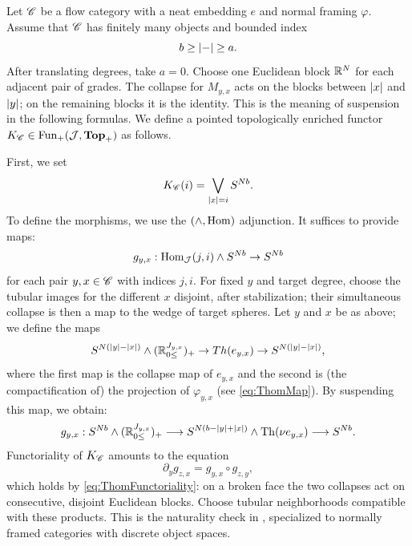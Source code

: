 \begin{constr}\label{con:topChOfCat}
    Let $\mathscr{C}$ be a flow category with a neat embedding $e$ and normal framing $\varphi$.
    Assume that $\mathscr{C}$ has finitely many objects and bounded index
\begin{equation*}
    b \geq \left\lvert-\right\rvert \geq a.
\end{equation*}
After translating degrees, take $a=0$. Choose one Euclidean block $\mathbb{R}^N$ for each adjacent pair of grades. The collapse for $M_{y,x}$ acts on the blocks between $\left\lvert x\right\rvert$ and $\left\lvert y\right\rvert$; on the remaining blocks it is the identity. This is the meaning of suspension in the following formulas. We define a pointed topologically enriched functor $K_{\mathscr{C}} \in \operatorname{Fun}_+(\mathcal{J},\mathbf{Top}_+)$ as follows.

    First, we set
    \begin{equation*}
        K_{\mathscr{C}}(i) = \bigvee_{\left\lvert x\right\rvert=i} S^{Nb}.
    \end{equation*}
    To define the morphisms, we use the $(\wedge, \operatorname{Hom})$ adjunction. It suffices to provide maps:
    \begin{equation*}
        g_{y,x}:\operatorname{Hom}_{\mathcal{J}}(j,i)\wedge S^{Nb} \to S^{Nb}
    \end{equation*}
    for each pair $y,x \in \mathscr{C}$ with indices $j,i$. For fixed $y$ and target degree, choose the tubular images for the different $x$ disjoint, after stabilization; their simultaneous collapse is then a map to the wedge of target spheres.
    Let $y$ and $x$ be as above; we define the maps
    \begin{equation*}
        S^{N(\left\lvert y\right\rvert-\left\lvert x\right\rvert)}\wedge (\mathbb{R}_{0 \leq}^{J_{y,x}})_+ \to  Th(e_{y,x}) \to S^{N(\left\lvert y\right\rvert-\left\lvert x\right\rvert)},
    \end{equation*}
    where the first map is the collapse map of $e_{y,x}$ and the second is (the compactification of) the projection of $\varphi_{y,x}$ (see \cref{eq:ThomMap}). By suspending this map, we obtain:
    \begin{equation*}
        g_{y,x}: S^{Nb}\wedge (\mathbb{R}_{0 \leq}^{J_{y,x}})_+
        \longrightarrow S^{N(b-\left\lvert y\right\rvert+\left\lvert x\right\rvert)}\wedge\operatorname{Th}(\nu e_{y,x})
        \longrightarrow S^{Nb}.
    \end{equation*}
    Functoriality of $K_{\mathscr{C}}$ amounts to the equation
    \begin{equation*}
        \partial_y g_{z,x} = g_{y,x} \circ g_{z,y},
    \end{equation*}
    which holds by \cref{eq:ThomFunctoriality}: on a broken face the two collapses act on consecutive, disjoint Euclidean blocks. Choose tubular neighborhoods compatible with these products. This is the naturality check in \cite[Proposition~2.24]{cote2023equivariant}, specialized to normally framed categories with discrete object spaces.
\end{constr}

